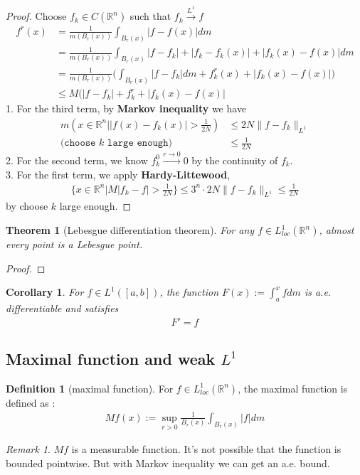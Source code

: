 \documentclass[a4paper,11pt,fleqn]{book}
\newtheorem{theorem}{Theorem}[section]
\newtheorem{corollary}{Corollary}[theorem]
\theoremstyle{definition}
\newtheorem{definition}{Definition}[section]
\theoremstyle{remark}
\newtheorem*{remark}{Remark}
\begin{document}
\begin{proof}
Choose $f_k \in C(\mathbb{R}^n)$ such that $f_k \overset{L^1}{\longrightarrow} f$ 
	\begin{align*}
		f^r(x) &= \frac{1}{m(B_r(x))} \int_{B_r(x)}|f - f(x)|dm\\
		&= \frac{1}{m(B_r(x))}\int_{B_r(x)} |f - f_k| + |f_k - f_k(x)| + |f_k(x) - f(x)|dm\\
		&= \frac{1}{m(B_r(x))}\bigg( \int_{B_r(x)} |f-f_k|dm + f^r_k(x) + |f_k(x) - f(x)|\bigg) \\
		&\le M(|f - f_k| + f^r_k + |f_k(x) - f(x)|
	\end{align*}
	1. For the third term, by \textbf{Markov inequality} we have
	\begin{align*}
		m(x \in \mathbb{R}^n| |f(x) - f_k(x)| > \frac{1}{2N}) &\le 2N \|f - f_k\|_{L^1}\\
		(\texttt{choose $k$ large enough)}
		&\le \frac{1}{2N}
	\end{align*}
	2. For the second term, we know $f^0_k \overset{r \rightarrow 0}{\longrightarrow} 0$ by the continuity of $f_k$. \\
	3. For the first term, we apply \textbf{Hardy-Littewood}, 
	\begin{align*}
		\{x \in \mathbb{R}^n| M|f_k - f| > \frac{1}{2N}\} \le 3^n\cdot 2N\|f - f_k\|_{L^1}\le \frac{1}{2N}
	\end{align*}
	by choose $k$ large enough. 
\end{proof}


\begin{theorem}[Lebesgue differentiation theorem]
	For any $f \in L^1_{loc}(\mathbb{R}^n)$, almost every point is a Lebesgue point. 
\end{theorem}
\begin{proof}
	
\end{proof}

\begin{corollary}	
	For $f \in L^1([a, b])$, the function $F(x) := \int_a^x fdm$ is a.e. differentiable and satisfies 
	\begin{align*}
		F' = f
	\end{align*}
\end{corollary}


\subsection{Maximal function and weak \texorpdfstring{$L^1$}{L\textasciicircum{}1}}
\begin{definition}[maximal function]
	For $f \in L_{loc}^1(\mathbb{R}^n)$, the maximal function is defined as :
	\begin{align*}
		Mf(x):= \sup_{r > 0}\frac{1}{B_r(x)}\int_{B_r(x)}|f|dm
	\end{align*}
\end{definition}
\begin{remark}
$Mf$ is a measurable function. It's not possible that the function is bounded pointwise. But with Markov inequality we can get an a.e. bound.
\end{remark}
\end{document}
